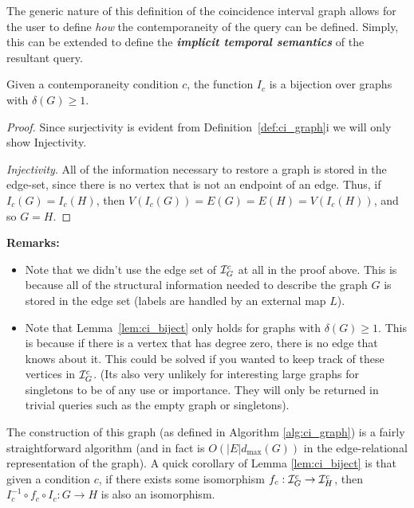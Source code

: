 The generic nature of this definition of the coincidence interval graph allows
for the user to define \textit{how} the contemporaneity of the query can be
defined. Simply, this can be extended to define the \textit{\bf implicit
  temporal semantics} of the resultant query.


\begin{lemma}
  \label{lem:ci_biject}
  Given a contemporaneity condition $c$, the function $I_c$ is a bijection over
  graphs with $\delta(G) \geq 1$.
\end{lemma}

\begin{proof}[Proof] Since surjectivity is evident from
  Definition~\ref{def:ci_graph}i we will only show Injectivity.
  
  \textit{Injectivity}. All of the information necessary to restore a graph is
  stored in the edge-set, since there is no vertex that is not an endpoint of an
  edge. Thus, if $I_c(G) = I_c(H)$, then $V(I_c(G)) = E(G) = E(H) = V(I_c(H))$,
  and so $G = H$.
\end{proof}

\clearpage
\noindent \textbf{Remarks:}
\begin{itemize}
  \item Note that we didn't use the edge set of $\mathcal{I}^c_G$ at all in the proof
    above. This is because all of the structural information needed to describe
    the graph $G$ is stored in the edge set (labels are handled by an external
    map $L$).
  \item Note that Lemma~\ref{lem:ci_biject} only holds for graphs with
    $\delta(G) \geq 1$. This is because if there is a vertex that has degree
    zero, there is no edge that knows about it. This could be solved if you
    wanted to keep track of these vertices in $\mathcal{I}^c_G$. (Its also very unlikely
    for interesting large graphs for singletons to be of any use or
    importance. They will only be returned in trivial queries such as the empty
    graph or singletons).
\end{itemize}

The construction of this graph (as defined in Algorithm \ref{alg:ci_graph}) is a
fairly straightforward algorithm (and in fact is $O(|E|d_{\max}(G))$ in the
edge-relational representation of the graph). A quick corollary of Lemma
\ref{lem:ci_biject} is that given a condition $c$, if there exists some
isomorphism $f_c : \mathcal{I}^c_G \to \mathcal{I}^c_H$, then $I_c^{-1} \circ f_c \circ I_c : G
\to H$ is also an isomorphism.

